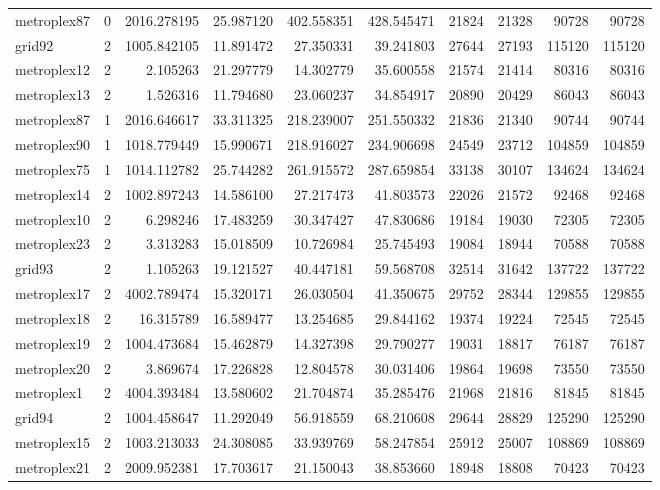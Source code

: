 \begin{longtable}{|l|r|r|r|r|r|r|r|r|r|}
metroplex87 & 0 & 2016.278195 & 25.987120 & 402.558351 & 428.545471 & 21824 & 21328 & 90728 & 90728 \\
grid92 & 2 & 1005.842105 & 11.891472 & 27.350331 & 39.241803 & 27644 & 27193 & 115120 & 115120 \\
metroplex12 & 2 & 2.105263 & 21.297779 & 14.302779 & 35.600558 & 21574 & 21414 & 80316 & 80316 \\
metroplex13 & 2 & 1.526316 & 11.794680 & 23.060237 & 34.854917 & 20890 & 20429 & 86043 & 86043 \\
metroplex87 & 1 & 2016.646617 & 33.311325 & 218.239007 & 251.550332 & 21836 & 21340 & 90744 & 90744 \\
metroplex90 & 1 & 1018.779449 & 15.990671 & 218.916027 & 234.906698 & 24549 & 23712 & 104859 & 104859 \\
metroplex75 & 1 & 1014.112782 & 25.744282 & 261.915572 & 287.659854 & 33138 & 30107 & 134624 & 134624 \\
metroplex14 & 2 & 1002.897243 & 14.586100 & 27.217473 & 41.803573 & 22026 & 21572 & 92468 & 92468 \\
metroplex10 & 2 & 6.298246 & 17.483259 & 30.347427 & 47.830686 & 19184 & 19030 & 72305 & 72305 \\
metroplex23 & 2 & 3.313283 & 15.018509 & 10.726984 & 25.745493 & 19084 & 18944 & 70588 & 70588 \\
grid93 & 2 & 1.105263 & 19.121527 & 40.447181 & 59.568708 & 32514 & 31642 & 137722 & 137722 \\
metroplex17 & 2 & 4002.789474 & 15.320171 & 26.030504 & 41.350675 & 29752 & 28344 & 129855 & 129855 \\
metroplex18 & 2 & 16.315789 & 16.589477 & 13.254685 & 29.844162 & 19374 & 19224 & 72545 & 72545 \\
metroplex19 & 2 & 1004.473684 & 15.462879 & 14.327398 & 29.790277 & 19031 & 18817 & 76187 & 76187 \\
metroplex20 & 2 & 3.869674 & 17.226828 & 12.804578 & 30.031406 & 19864 & 19698 & 73550 & 73550 \\
metroplex1 & 2 & 4004.393484 & 13.580602 & 21.704874 & 35.285476 & 21968 & 21816 & 81845 & 81845 \\
grid94 & 2 & 1004.458647 & 11.292049 & 56.918559 & 68.210608 & 29644 & 28829 & 125290 & 125290 \\
metroplex15 & 2 & 1003.213033 & 24.308085 & 33.939769 & 58.247854 & 25912 & 25007 & 108869 & 108869 \\
metroplex21 & 2 & 2009.952381 & 17.703617 & 21.150043 & 38.853660 & 18948 & 18808 & 70423 & 70423 \\

\end{longtable}
